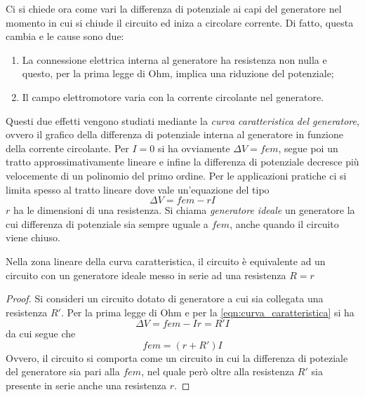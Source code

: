 Ci si chiede ora come vari la differenza di potenziale ai capi del generatore nel momento
in cui si chiude il circuito ed iniza a circolare corrente. Di fatto, questa cambia e le cause sono due:
\begin{enumerate}
    \item La connessione elettrica interna al generatore ha resistenza non nulla e questo, per la prima legge di Ohm, implica una riduzione del potenziale;
    \item Il campo elettromotore varia con la corrente circolante nel generatore.
\end{enumerate}
Questi due effetti vengono studiati mediante la \textit{curva caratteristica del generatore},
ovvero il grafico della differenza di potenziale interna al generatore in funzione della corrente circolante.
Per $I=0$ si ha ovviamente $\Delta V=fem$, segue poi un tratto approssimativamente lineare
e infine la differenza di potenziale decresce più velocemente di un polinomio del primo ordine.
Per le applicazioni pratiche ci si limita spesso al tratto lineare dove vale un'equazione del tipo
\begin{equation}
    \label{eqn:curva_caratteristica}
    \Delta V=fem - rI
\end{equation}
$r$ ha le dimensioni di una resistenza.
Si chiama \textit{generatore ideale} un generatore la cui differenza di potenziale sia sempre uguale a $fem$,
anche quando il circuito viene chiuso.
\begin{obs}
    Nella zona lineare della curva caratteristica, il circuito è equivalente ad un circuito con un generatore ideale messo in serie ad una resistenza $R=r$
\end{obs}
\begin{proof}
    Si consideri un circuito dotato di generatore a cui sia collegata una resistenza $R'$.
    Per la prima legge di Ohm e per la \eqref{eqn:curva_caratteristica} si ha
    \[
        \Delta V=fem-Ir=R'I
    \]
    da cui segue che
    \[
        fem=(r+R')I
    \]
    Ovvero, il circuito si comporta come un circuito in cui la differenza di poteziale del generatore sia pari alla $fem$,
    nel quale però oltre alla resistenza $R'$ sia presente in serie anche una resistenza $r$.
\end{proof}

